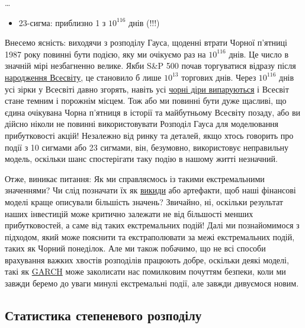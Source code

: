 \documentclass[
  letterpaper,
]{report}
\providecommand{\tightlist}{%
  \setlength{\itemsep}{0pt}\setlength{\parskip}{0pt}}\usepackage{longtable,booktabs,array}
\begin{document}
\ldots{}

\begin{itemize}
\tightlist
\item
  23-сигма: приблизно 1 з \(10^{116}\) днів (!!!)
\end{itemize}

Внесемо ясність: виходячи з розподілу Гауса, щоденні втрати Чорної
п'ятниці 1987 року повинні бути подією, яку ми очікуємо раз на
\(10^{116}\) днів. Це число в значній мірі незбагненно велике. Якби S\&P
500 почав торгуватися відразу після
\href{https://en.wikipedia.org/wiki/Age_of_the_universe}{народження
Всесвіту}, це становило б лише \(10^{13}\) торгових днів. Через
\(10^{116}\) днів усі зірки у Всесвіті давно згорять, навіть усі
\href{https://en.wikipedia.org/wiki/Future_of_an_expanding_universe\#Dark_Era_and_Photon_Age}{чорні
діри випаруються} і Всесвіт стане темним і порожнім місцем. Тож або ми
повинні бути дуже щасливі, що єдина очікувана Чорна п'ятниця в історії
та майбутньому Всесвіту позаду, або ви дійсно ніколи не повинні
використовувати Розподіл Гауса для моделювання прибутковості акцій!
Незалежно від ринку та деталей, якщо хтось говорить про події з 10
сигмами або 23 сигмами, він, безумовно, використовує неправильну модель,
оскільки шанс спостерігати таку подію в нашому житті незначний.

Отже, виникає питання: Як ми справляємось із такими екстремальними
значеннями? Чи слід позначати їх як
\href{https://en.wikipedia.org/wiki/Outlier}{викиди} або артефакти, щоб
наші фінансові моделі краще описували більшість значень? Звичайно, ні,
оскільки результат наших інвестицій може критично залежати не від
більшості менших прибутковостей, а саме від таких екстремальних подій!
Далі ми познайомимося з підходом, який може пояснити та екстраполювати
за межі екстремальних подій, таких як Чорний понеділок. Але ми також
побачимо, що не всі способи врахування важких хвостів розподілів
працюють добре, оскільки деякі моделі, такі як
\href{https://en.wikipedia.org/wiki/Autoregressive_conditional_heteroskedasticity}{GARCH}
може заколисати нас помилковим почуттям безпеки, коли ми завжди беремо
до уваги минулі екстремальні події, але завжди дивуємося новим.

\hypertarget{ux441ux442ux430ux442ux438ux441ux442ux438ux43aux430-ux441ux442ux435ux43fux435ux43dux435ux432ux43eux433ux43e-ux440ux43eux437ux43fux43eux434ux456ux43bux443}{%
\subsection{Статистика степеневого
розподілу}\label{ux441ux442ux430ux442ux438ux441ux442ux438ux43aux430-ux441ux442ux435ux43fux435ux43dux435ux432ux43eux433ux43e-ux440ux43eux437ux43fux43eux434ux456ux43bux443}}
\end{document}

